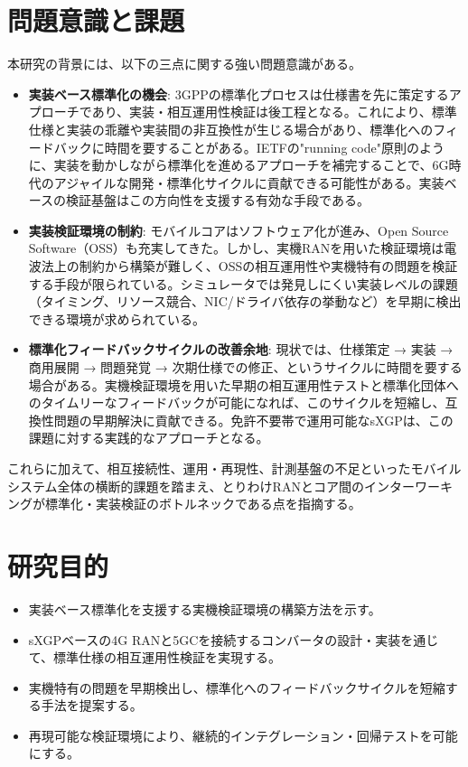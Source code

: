 \section{問題意識と課題}
本研究の背景には、以下の三点に関する強い問題意識がある。

\begin{itemize}
	\item \textbf{実装ベース標準化の機会}: 3GPPの標準化プロセスは仕様書を先に策定するアプローチであり、実装・相互運用性検証は後工程となる。これにより、標準仕様と実装の乖離や実装間の非互換性が生じる場合があり、標準化へのフィードバックに時間を要することがある。IETFの"running code"原則のように、実装を動かしながら標準化を進めるアプローチを補完することで、6G時代のアジャイルな開発・標準化サイクルに貢献できる可能性がある。実装ベースの検証基盤はこの方向性を支援する有効な手段である。

	\item \textbf{実装検証環境の制約}: モバイルコアはソフトウェア化が進み、Open Source Software（OSS）も充実してきた。しかし、実機RANを用いた検証環境は電波法上の制約から構築が難しく、OSSの相互運用性や実機特有の問題を検証する手段が限られている。シミュレータでは発見しにくい実装レベルの課題（タイミング、リソース競合、NIC/ドライバ依存の挙動など）を早期に検出できる環境が求められている。

	\item \textbf{標準化フィードバックサイクルの改善余地}: 現状では、仕様策定 → 実装 → 商用展開 → 問題発覚 → 次期仕様での修正、というサイクルに時間を要する場合がある。実機検証環境を用いた早期の相互運用性テストと標準化団体へのタイムリーなフィードバックが可能になれば、このサイクルを短縮し、互換性問題の早期解決に貢献できる。免許不要帯で運用可能なsXGPは、この課題に対する実践的なアプローチとなる。
\end{itemize}これらに加えて、相互接続性、運用・再現性、計測基盤の不足といったモバイルシステム全体の横断的課題を踏まえ、とりわけRANとコア間のインターワーキングが標準化・実装検証のボトルネックである点を指摘する。

\section{研究目的}
\begin{itemize}
	\item 実装ベース標準化を支援する実機検証環境の構築方法を示す。
	\item sXGPベースの4G RANと5GCを接続するコンバータの設計・実装を通じて、標準仕様の相互運用性検証を実現する。
	\item 実機特有の問題を早期検出し、標準化へのフィードバックサイクルを短縮する手法を提案する。
	\item 再現可能な検証環境により、継続的インテグレーション・回帰テストを可能にする。
\end{itemize}

